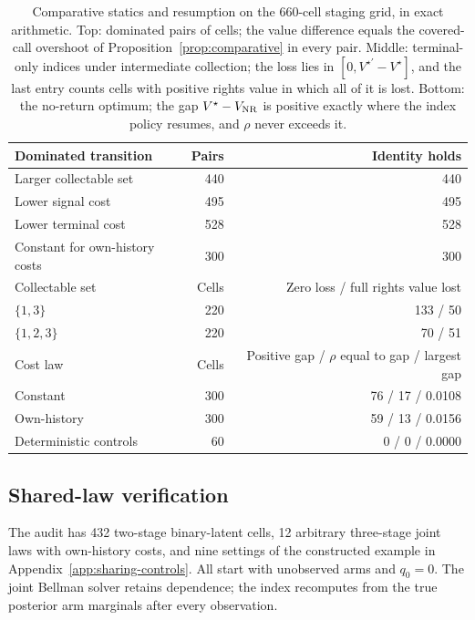 \begin{table}[htb]
\centering\small
\begin{tabular}{lrr}
\toprule
Dominated transition & Pairs & Identity holds \\
\midrule
Larger collectable set & 440 & 440 \\
Lower signal cost & 495 & 495 \\
Lower terminal cost & 528 & 528 \\
Constant for own-history costs & 300 & 300 \\
\midrule
Collectable set & Cells & Zero loss / full rights value lost \\
\midrule
$\{1,3\}$ & 220 & 133 / 50 \\
$\{1,2,3\}$ & 220 & 70 / 51 \\
\midrule
Cost law & Cells & Positive gap / $\rho$ equal to gap / largest gap \\
\midrule
Constant & 300 & 76 / 17 / 0.0108 \\
Own-history & 300 & 59 / 13 / 0.0156 \\
Deterministic controls & 60 & 0 / 0 / 0.0000 \\
\bottomrule
\end{tabular}
\caption{Comparative statics and resumption on the 660-cell staging grid, in
exact arithmetic. Top: dominated pairs of cells; the value difference equals
the covered-call overshoot of Proposition~\ref{prop:comparative} in every pair.
Middle: terminal-only indices under intermediate collection; the loss lies in
$[0,V^{\star\prime}-V^\star]$, and the last entry counts cells with positive
rights value in which all of it is lost. Bottom: the no-return optimum; the gap
$V^\star-V_{\rm NR}$ is positive exactly where the index policy resumes, and
$\rho$ never exceeds it.}
\label{tab:comparative}
\end{table}

\subsection{Shared-law verification}
\label{app:sharing-results}

The audit has 432 two-stage binary-latent cells, 12 arbitrary three-stage joint
laws with own-history costs, and nine settings of the constructed example in
Appendix~\ref{app:sharing-controls}. All start with unobserved arms and $q_0=0$.
The joint Bellman solver retains dependence; the index recomputes from the true
posterior arm marginals after every observation.

